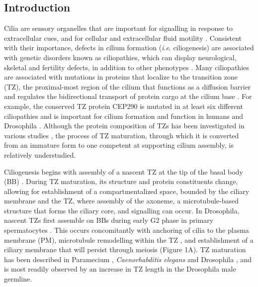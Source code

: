 \documentclass[12pt, twoside, letterpaper]{article}
\newcommand{\ie}{\textit{i}.\textit{e}.}
\begin{document}
\begin{doublespacing}
\begin{linenumbers}
    \section*{Introduction}
    Cilia are sensory organelles that are important for
    signalling in response to extracellular cues,
    and for cellular and extracellular fluid motility
    \citep{satir2010primary, marshall2006cilia, eley2005cilia, brooks2014multiciliated}.
    Consistent with their importance,
    defects in cilium formation (\ie{} ciliogenesis) are associated with genetic disorders
    known as ciliopathies, which can display
    neurological, skeletal and fertility defects, in addition to other phenotypes
    \citep{waters2011ciliopathies, valente2014primary, hammarsjo2017novel, inaba2016sperm}.
    Many ciliopathies are associated with mutations in proteins that localize
    to the transition zone (TZ), the proximal-most region of the cilium that
    functions as a diffusion barrier and regulates the
    bidirectional transport of protein cargo at the cilium base
    \citep{reiter2012base, szymanska2012transition}.
    For example, the conserved TZ protein CEP290 is mutated in at least
    six different ciliopathies
    \citep{rachel2012photoreceptor}
    and is important for cilium formation
    and function in humans \citep{shimada2017vitro, stowe2012centriolar}
    and Drosophila \citep{basiri2014migrating}.
    Although the protein composition of TZs has been investigated in various
    studies \citep{gonccalves2017ciliary},
    the process of TZ maturation, through which it is converted from an
    immature form to one competent at supporting
    cilium assembly, is relatively understudied.

    Ciliogenesis begins with assembly of a nascent TZ at the tip of
    the basal body (BB) \citep{reiter2012base}.
    During TZ maturation, its structure and protein
    constituents change, allowing for
    establishment of a compartmentalized space, bounded by the ciliary membrane
    and the TZ, where assembly of the axoneme, a microtubule-based structure
    that forms the ciliary core,
    and signalling can occur.
    In Drosophila, nascent TZs first assemble on BBs
    during early G2 phase in primary spermatocytes \citep{riparbelli2012assembly}.
    This occurs concomitantly with anchoring of cilia to the plasma membrane (PM),
    microtubule remodelling within the TZ \citep{gottardo2013cilium},
    and establishment of a
    ciliary membrane that will persist through meiosis
    \citep{riparbelli2012assembly} (Figure 1A).
    TZ maturation has been described in
    Paramecium \citep{aubusson2015transition},
    \textit{Caenorhabditis elegans} \citep{serwas2017centrioles} and
    Drosophila \citep{gottardo2013cilium},
    and is most readily observed by an increase in TZ length
    in the Drosophila male germline.


\end{linenumbers}
\end{doublespacing}
\end{document}
